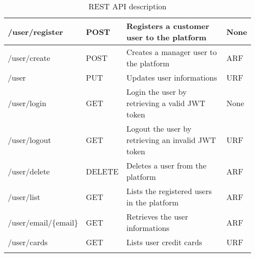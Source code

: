 \begin{longtable}{|p{}|p{} |p{}|p{}|}
/user/register & POST & Registers a customer user to the platform & None\\\hline

/user/create & POST & Creates a manager user to the platform & ARF\\\hline

/user & PUT & Updates user informations & URF\\\hline

/user/login & GET & Login the user by retrieving a valid JWT token & None\\\hline

/user/logout & GET & Logout the user by retrieving an invalid JWT token & URF\\\hline

/user/delete & DELETE & Deletes a user from the platform & ARF\\\hline

/user/list & GET & Lists the registered users in the platform & ARF\\\hline

/user/email/\{email\} & GET & Retrieves the user informations & ARF\\\hline

/user/cards & GET & Lists user credit cards & URF\\\hline

\caption{REST API description}
\label{tab:termGlossary}
\end{longtable}